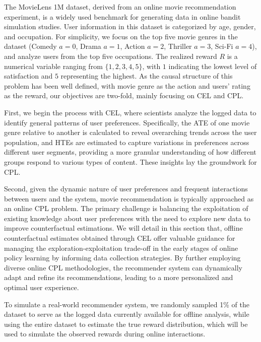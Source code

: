 The MovieLens 1M dataset, derived from an online movie recommendation experiment, is a widely used benchmark for generating data in online bandit simulation studies. User information in this dataset is categorized by age, gender, and occupation. For simplicity, we focus on the top five movie genres in the dataset (Comedy $a=0$, Drama $a=1$, Action $a=2$, Thriller $a=3$, Sci-Fi $a=4$), and analyze users from the top five occupations. The realized reward $R$ is a numerical variable ranging from $\{1,2,3,4,5\}$, with $1$ indicating the lowest level of satisfaction and $5$ representing the highest. As the causal structure of this problem has been well defined, with movie genre as the action and users' rating as the reward, our objectives are two-fold, mainly focusing on CEL and CPL.

First, we begin the process with \acrshort{CEL}, where scientists analyze the logged data to identify general patterns of user preferences. Specifically, the \acrshort{ATE} of one movie genre relative to another is calculated to reveal overarching trends across the user population, and \acrshort{HTE}s are estimated to capture variations in preferences across different user segments, providing a more granular understanding of how different groups respond to various types of content. These insights lay the groundwork for \acrshort{CPL}.

Second, given the dynamic nature of user preferences and frequent interactions between users and the system, movie recommendation is typically approached as an online \acrshort{CPL} problem. The primary challenge is balancing the exploitation of existing knowledge about user preferences with the need to explore new data to improve counterfactual estimations. We will detail in this section that, offline counterfactual estimates obtained through \acrshort{CEL} offer valuable guidance for managing the exploration-exploitation trade-off in the early stages of online policy learning by informing data collection strategies. By further employing diverse online \acrshort{CPL} methodologies, the recommender system can dynamically adapt and refine its recommendations, leading to a more personalized and optimal user experience.

To simulate a real-world recommender system, we randomly sampled 1\% of the dataset to serve as the logged data currently available for offline analysis, while using the entire dataset to estimate the true reward distribution, which will be used to simulate the observed rewards during online interactions.

